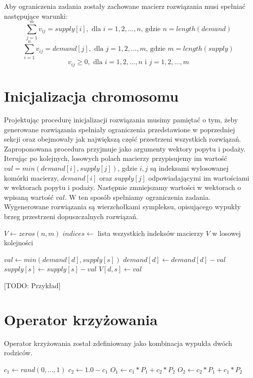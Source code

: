Aby ograniczenia zadania zostały zachowane macierz rozwiązania musi spełniać następujące warunki:
$$\sum_{j=1}^{m} v_{ij} = supply[i], \text{ dla } i = 1, 2, \dots, n \text{, gdzie } n = length(demand)$$
$$\sum_{i=1}^{n} v_{ij} = demand[j], \text{ dla } j = 1, 2, \dots, m \text{, gdzie } m = length(supply)$$
$$v_{ij} \ge 0, \text{ dla } i = 1, 2, \dots, n \text{ i } j = 1, 2, \dots, m$$


\section{Inicjalizacja chromosomu}
Projektując procedurę inicjalizacji rozwiązania musimy pamiętać o tym, żeby generowane rozwiązania spełniały ograniczenia przedstawione 
w poprzedniej sekcji oraz obejmowały jak największą część przestrzeni wszystkich rozwiązań. Zaproponowana procedura przyjmuje jako argumenty 
wektory popytu i podaży. Iterując po kolejnych, losowych polach macierzy przypisujemy im wartość $val = min(demand[i], supply[j])$, gdzie 
$i, j$ są indeksami wylosowanej komórki macierzy, $demand[i]$ oraz $supply[j]$ odpowiadającymi im wartościami w wektorach popytu i podaży. 
Następnie zmniejszamy wartości w wektorach o wpisaną wartość $val$. W ten sposób spełniamy ograniczenia zadania. Wygenerowane rozwiązania są 
wierzchołkami sympleksu, opisującego wypukły brzeg przestrzeni dopuszczalnych rozwiązań.

\begin{pseudokod}
    $V \gets zeros(n, m)$
    $indices \gets$ lista wszystkich indeksów macierzy $V$ w losowej kolejności\;
    
     {
        $val \gets min(demand[d], supply[s])$\;
        $demand[d] \gets demand[d] - val$\;
        $supply[s] \gets supply[s] - val$\;
        $V[d, s] \gets val$\;
    }

\end{pseudokod}

[TODO: Przykład]


\section{Operator krzyżowania}
Operator krzyżowania został zdefiniowany jako kombinacja wypukła dwóch rodziców.

\begin{pseudokod}
    $c_1 \gets rand(0,\dots,1)$\;
    $c_2 \gets 1.0 - c_1$\;
    $O_1 \gets c_1 * P_1 + c_2 * P_2$\;
    $O_2 \gets c_2 * P_1 + c_1 * P_2$\;
    \;
\end{pseudokod}

